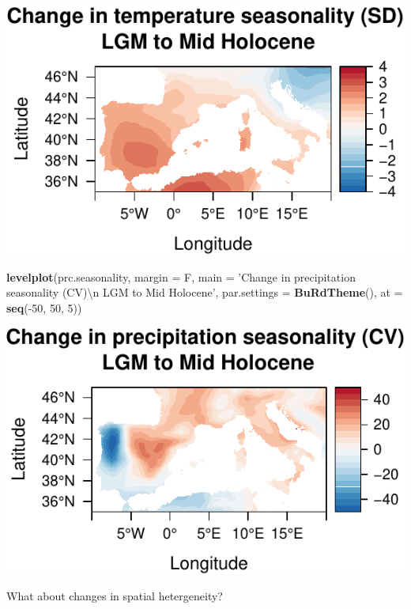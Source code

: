 \documentclass[11pt,]{tufte-handout}
\newenvironment{Shaded}{}{}
\newcommand{\KeywordTok}[1]{\textcolor[rgb]{0.00,0.44,0.13}{\textbf{{#1}}}}
\newcommand{\DataTypeTok}[1]{\textcolor[rgb]{0.56,0.13,0.00}{{#1}}}
\newcommand{\DecValTok}[1]{\textcolor[rgb]{0.25,0.63,0.44}{{#1}}}
\newcommand{\CharTok}[1]{\textcolor[rgb]{0.25,0.44,0.63}{{#1}}}
\newcommand{\StringTok}[1]{\textcolor[rgb]{0.25,0.44,0.63}{{#1}}}
\newcommand{\NormalTok}[1]{{#1}}
\begin{document}
\includegraphics{proxymodelcomparison_files/figure-latex/unnamed-chunk-8-1}

\begin{Shaded}
\begin{Highlighting}[]
\KeywordTok{levelplot}\NormalTok{(prc.seasonality, }\DataTypeTok{margin =} \NormalTok{F, }
          \DataTypeTok{main =} \StringTok{'Change in precipitation seasonality (CV)}\CharTok{\textbackslash{}n}\StringTok{ LGM to Mid Holocene'}\NormalTok{, }
          \DataTypeTok{par.settings =} \KeywordTok{BuRdTheme}\NormalTok{(), }
          \DataTypeTok{at =} \KeywordTok{seq}\NormalTok{(-}\DecValTok{50}\NormalTok{, }\DecValTok{50}\NormalTok{, }\DecValTok{5}\NormalTok{))}
\end{Highlighting}
\end{Shaded}

\includegraphics{proxymodelcomparison_files/figure-latex/unnamed-chunk-8-2}

What about changes in spatial hetergeneity?
\end{document}
